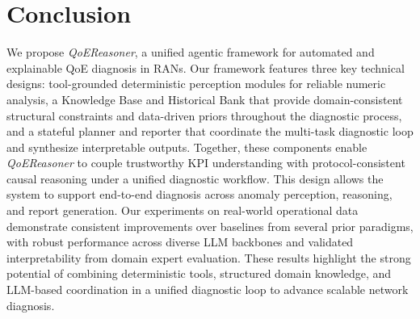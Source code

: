 \documentclass[sigconf,10pt]{acmart} %
\begin{document}
\section{Conclusion}
We propose \textit{QoEReasoner}, a unified agentic framework for automated and explainable QoE diagnosis in RANs. Our framework features three key technical designs: tool-grounded deterministic perception modules for reliable numeric analysis, a Knowledge Base and Historical Bank that provide domain-consistent structural constraints and data-driven priors throughout the diagnostic process, and a stateful planner and reporter that coordinate the multi-task diagnostic loop and synthesize interpretable outputs. Together, these components enable \textit{QoEReasoner} to couple trustworthy KPI understanding with protocol-consistent causal reasoning under a unified diagnostic workflow. This design allows the system to support end-to-end diagnosis across anomaly perception, reasoning, and report generation. Our experiments on real-world operational data demonstrate consistent improvements over baselines from several prior paradigms, with robust performance across diverse LLM backbones and validated interpretability from domain expert evaluation. These results highlight the strong potential of combining deterministic tools, structured domain knowledge, and LLM-based coordination in a unified diagnostic loop to advance scalable network diagnosis.

\end{document}
